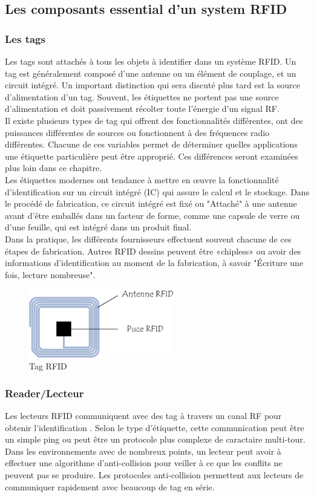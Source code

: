 \documentclass[11pt, a4paper, twoside]{book}
\begin{document}
\subsection{Les composants essential d'un system RFID}
\subsubsection{Les tags}
Les tags sont attachés à tous les objets à identifier dans un système RFID. Un tag est généralement
composé d'une antenne ou un élément de couplage, et un circuit intégré. Un important
distinction qui sera discuté plus tard est la source d'alimentation d'un tag. Souvent, les étiquettes ne portent pas une source d'alimentation et doit passivement récolter toute l'énergie d'un signal RF.\\

Il existe plusieurs types de tag qui offrent des fonctionnalités différentes, ont des puissances différentes
de sources ou fonctionnent à des fréquences radio différentes. Chacune de ces variables permet de déterminer
quelles applications une étiquette particulière peut être approprié. Ces différences seront examinées plus loin dans ce chapitre.\\

Les étiquettes modernes ont tendance à mettre en œuvre la fonctionnalité d'identification sur un circuit intégré (IC) qui
assure le calcul et le stockage. Dans le procédé de fabrication, ce circuit intégré est fixé ou
"Attaché" à une antenne avant d'être emballés dans un facteur de forme, comme une capsule de verre ou d'une feuille, qui est intégré dans un produit final.\\
Dans la pratique, les différents fournisseurs effectuent souvent chacune de ces étapes de fabrication. Autres RFID
dessins peuvent être «chipless» ou avoir des informations d'identification au moment de la fabrication, à savoir
"Écriture une fois, lecture nombreuse". \\
\begin{figure}[h!]
\centering
\includegraphics[height=3cm]{tag}
\caption{Tag RFID}
\end{figure}
\subsubsection{Reader/Lecteur}
Les lecteurs RFID communiquent avec des tag à travers un canal RF pour obtenir l'identification
. Selon le type d'étiquette, cette communication peut être un simple ping ou peut être un protocole plus complexe de caractaire multi-tour. Dans les environnements avec de nombreux points, un lecteur peut avoir à effectuer une algorithme d'anti-collision pour veiller à ce que les conflits ne peuvent pas se produire. Les protocoles anti-collision permettent aux lecteurs de communiquer rapidement avec beaucoup de tag en série.
\end{document}
